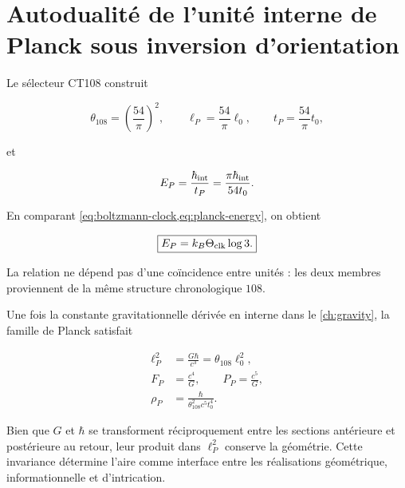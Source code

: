 \section{Autodualité de l'unité interne de Planck sous inversion d'orientation}

Le sélecteur CT108 construit

\begin{equation}
\theta_{108}=\left(\frac{54}{\pi}\right)^2,
\qquad
\ell_P=\frac{54}{\pi}\ell_0,
\qquad
t_P=\frac{54}{\pi}t_0,
\label{eq:planck-length-time}
\end{equation}

et

\begin{equation}
E_P=\frac{\hbar_{\rm int}}{t_P}
=\frac{\pi\hbar_{\rm int}}{54t_0}.
\label{eq:planck-energy}
\end{equation}

En comparant \cref{eq:boltzmann-clock,eq:planck-energy}, on obtient

\begin{equation}
\boxed{E_P=k_B\Theta_{\rm clk}\log3.}
\label{eq:planck-trit}
\end{equation}

La relation ne dépend pas d'une coïncidence entre unités : les deux membres
proviennent de la même structure chronologique \(108\).

Une fois la constante gravitationnelle dérivée en interne dans le
\cref{ch:gravity}, la famille de Planck satisfait

\begin{align}
\ell_P^2&=\frac{G\hbar}{c^3}=\theta_{108}\ell_0^2,
\label{eq:planck-area}\\
F_P&=\frac{c^4}{G},
\qquad
P_P=\frac{c^5}{G},
\label{eq:planck-force-power}\\
\rho_P&=\frac{\hbar}{\theta_{108}^2c^5t_0^4}.
\label{eq:planck-density}
\end{align}

Bien que \(G\) et \(\hbar\) se transforment réciproquement entre les sections
antérieure et postérieure au retour, leur produit dans \(\ell_P^2\) conserve la
géométrie. Cette invariance détermine l'aire comme interface entre les
réalisations géométrique, informationnelle et d'intrication.
